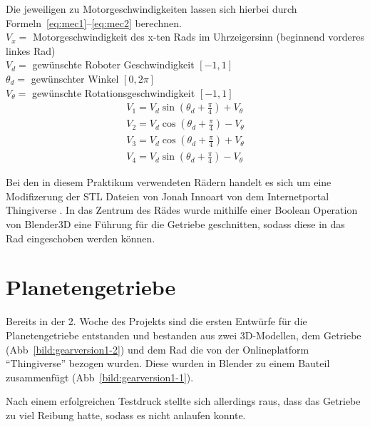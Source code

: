 Die jeweiligen zu Motorgeschwindigkeiten lassen sich hierbei durch Formeln~\ref{eq:mec1}--\ref{eq:mec2} berechnen.\\

$V_x =$ Motorgeschwindigkeit des x-ten Rads im Uhrzeigersinn (beginnend vorderes linkes Rad)\\
$V_d =$ gewünschte Roboter Geschwindigkeit $[-1, 1]$\\
$\theta_d =$ gewünschter Winkel $[0, 2\pi]$\\
$V_\theta =$ gewünschte Rotationsgeschwindigkeit $[-1, 1]$\\


\begin{align}
	V_1 = V_d\sin{(\theta_d+\frac{\pi}{4})} + V_\theta \label{eq:mec1}\\
	V_2 = V_d\cos{(\theta_d+\frac{\pi}{4})} - V_\theta\\
	V_3 = V_d\cos{(\theta_d+\frac{\pi}{4})} + V_\theta\\
	V_4 = V_d\sin{(\theta_d+\frac{\pi}{4})} - V_\theta \label{eq:mec2}
\end{align} 

Bei den in diesem Praktikum verwendeten Rädern handelt es sich um eine Modifizerung der STL Dateien von Jonah Innoart von dem Internetportal Thingiverse \cite{link:mecanum44}. 
In das Zentrum des Rädes wurde mithilfe einer Boolean Operation von Blender3D eine Führung für die Getriebe geschnitten, sodass diese in das Rad eingeschoben werden können.

\section{Planetengetriebe}

Bereits in der 2. Woche des Projekts sind die ersten Entwürfe für die Planetengetriebe entstanden und bestanden aus zwei 3D-Modellen, dem Getriebe (Abb~\ref{bild:gearversion1-2}) und dem Rad die von der Onlineplatform ``Thingiverse'' bezogen wurden.
Diese wurden in Blender zu einem Bauteil zusammenfügt (Abb~\ref{bild:gearversion1-1}). 

Nach einem erfolgreichen Testdruck stellte sich allerdings raus, dass das Getriebe zu viel Reibung hatte, sodass es nicht anlaufen konnte.


